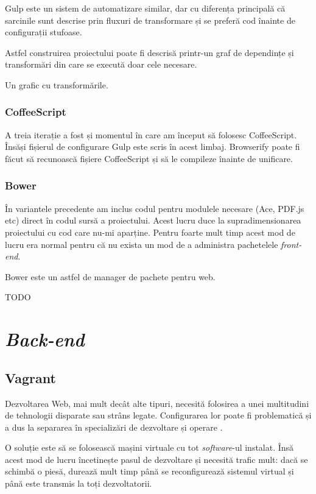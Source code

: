 \documentclass[a4wide,12pt]{report}
\newcommand{\eng}[1]{\emph{#1}} %
\newcommand{\acr}[1]{{\textsmaller[1]{\textsc{#1}}}} %
\newcommand{\idee}[1]{{\color{red} #1}}
\begin{document}
Gulp este un sistem de automatizare similar, dar cu diferența principală că
sarcinile sunt descrise prin fluxuri de transformare și se preferă cod înainte
de configurații stufoase.

Astfel construirea proiectului poate fi descrisă printr-un graf de dependințe și
transformări din care se execută doar cele necesare.

\idee{Un grafic cu transformările.}

\subsubsection{CoffeeScript}

A treia iterație a fost și momentul în care am început să folosesc CoffeeScript.
Însăși fișierul de configurare Gulp este scris în acest limbaj. Browserify poate
fi făcut să recunoască fișiere CoffeeScript și să le compileze înainte de
unificare.

\subsubsection{Bower}

În variantele precedente am inclus codul pentru modulele necesare (Ace, PDF.js
etc) direct în codul sursă a proiectului. Acest lucru duce la supradimensionarea
proiectului cu cod care nu-mi aparține. Pentru foarte mult timp acest mod de
lucru era normal pentru că nu exista un mod de a administra pachetelele
\eng{front-end}.

Bower este un astfel de manager de pachete pentru web.

\idee{TODO}

\section{\eng{Back-end}}

\subsection{Vagrant}

Dezvoltarea Web, mai mult decât alte tipuri, necesită folosirea a unei
multitudini de tehnologii disparate sau strâns legate. Configurarea lor poate fi
problematică și a dus la separarea în specializări de dezvoltare și operare
\acr{IT}.

O soluție este să se folosească mașini virtuale cu tot \eng{software}-ul
instalat. Însă acest mod de lucru încetinește pasul de dezvoltare și necesită
trafic mult: dacă se schimbă o piesă, durează mult timp până se reconfigurează
sistemul virtual și până este transmis la toți dezvoltatorii.
\end{document}

